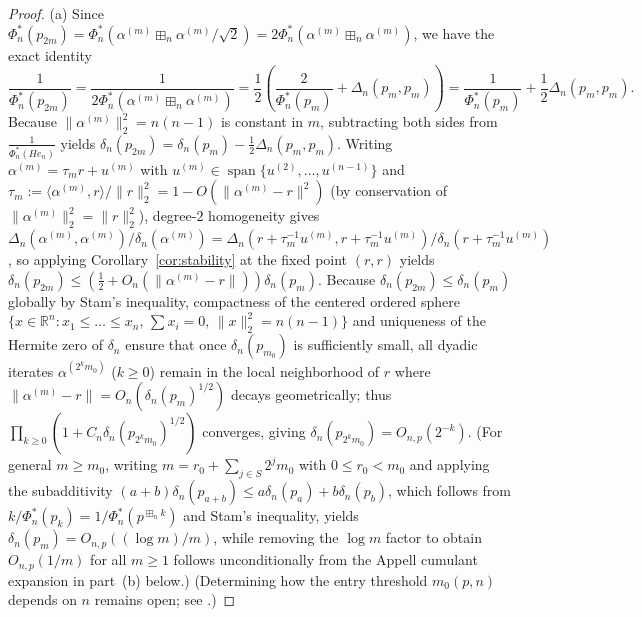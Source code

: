 \documentclass[11pt,a4paper]{article}
\theoremstyle{definition}
\DeclareMathOperator{\Span}{span}
\newcommand{\R}{\mathbb{R}}
\newcommand{\boxplusn}{\boxplus_n}
\begin{document}
\begin{proof}
(a) Since $\Phi_n^*(p_{2m}) = \Phi_n^*(\alpha^{(m)} \boxplusn \alpha^{(m)} / \sqrt{2}) = 2 \Phi_n^*(\alpha^{(m)} \boxplusn \alpha^{(m)})$, we have the exact identity
\[
\frac{1}{\Phi_n^*(p_{2m})} = \frac{1}{2 \Phi_n^*(\alpha^{(m)} \boxplusn \alpha^{(m)})} = \frac{1}{2} \left( \frac{2}{\Phi_n^*(p_m)} + \Delta_n(p_m, p_m) \right) = \frac{1}{\Phi_n^*(p_m)} + \frac{1}{2} \Delta_n(p_m, p_m).
\]
Because $\|\alpha^{(m)}\|_2^2 = n(n-1)$ is constant in $m$, subtracting both sides from $\frac{1}{\Phi_n^*(He_n)}$ yields $\delta_n(p_{2m}) = \delta_n(p_m) - \frac{1}{2}\Delta_n(p_m, p_m)$. Writing $\alpha^{(m)} = \tau_m r + u^{(m)}$ with $u^{(m)} \in \Span\{u^{(2)},\dots,u^{(n-1)}\}$ and $\tau_m := \langle \alpha^{(m)}, r\rangle / \|r\|_2^2 = 1 - O(\|\alpha^{(m)} - r\|^2)$ (by conservation of $\|\alpha^{(m)}\|_2^2 = \|r\|_2^2$), degree-$2$ homogeneity gives $\Delta_n(\alpha^{(m)},\alpha^{(m)})/\delta_n(\alpha^{(m)}) = \Delta_n(r + \tau_m^{-1} u^{(m)}, r + \tau_m^{-1} u^{(m)})/\delta_n(r + \tau_m^{-1} u^{(m)})$, so applying Corollary~\ref{cor:stability} at the fixed point $(r, r)$ yields $\delta_n(p_{2m}) \le (\frac{1}{2} + O_n(\|\alpha^{(m)} - r\|)) \delta_n(p_m)$. Because $\delta_n(p_{2m}) \le \delta_n(p_m)$ globally by Stam's inequality, compactness of the centered ordered sphere $\{x \in \R^n : x_1 \le \dots \le x_n,\, \sum x_i = 0,\, \|x\|_2^2 = n(n-1)\}$ and uniqueness of the Hermite zero of $\delta_n$ ensure that once $\delta_n(p_{m_0})$ is sufficiently small, all dyadic iterates $\alpha^{(2^k m_0)}$ ($k \ge 0$) remain in the local neighborhood of $r$ where $\|\alpha^{(m)} - r\| = O_n(\delta_n(p_m)^{1/2})$ decays geometrically; thus $\prod_{k \ge 0}(1 + C_n \delta_n(p_{2^k m_0})^{1/2})$ converges, giving $\delta_n(p_{2^k m_0}) = O_{n,p}(2^{-k})$. (For general $m \ge m_0$, writing $m = r_0 + \sum_{j \in S} 2^j m_0$ with $0 \le r_0 < m_0$ and applying the subadditivity $(a+b)\delta_n(p_{a+b}) \le a\delta_n(p_a) + b\delta_n(p_b)$, which follows from $k/\Phi_n^*(p_k) = 1/\Phi_n^*(p^{\boxplusn k})$ and Stam's inequality, yields $\delta_n(p_m) = O_{n,p}((\log m)/m)$, while removing the $\log m$ factor to obtain $O_{n,p}(1/m)$ for all $m \ge 1$ follows unconditionally from the Appell cumulant expansion in part~(b) below.) (Determining how the entry threshold $m_0(p,n)$ depends on $n$ remains open; see \cite[Question~8.5]{HH2026}.)


\end{proof}
\end{document}
